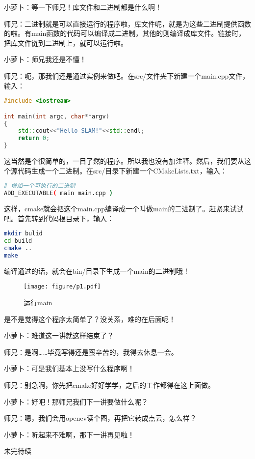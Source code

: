 \documentclass[9pt,a4paper]{article}
\begin{document}
小萝卜：等一下师兄！库文件和二进制都是什么啊！

师兄：二进制就是可以直接运行的程序啦，库文件呢，就是为这些二进制提供函数的啦。有main函数的代码可以编译成二进制，其他的则编译成库文件。链接时，把库文件链到二进制上，就可以运行啦。

小萝卜：师兄我还是不懂！

师兄：呃，那我们还是通过实例来做吧。在src/文件夹下新建一个main.cpp文件，输入：

\begin{lstlisting}[language=C++]
#include <iostream>

int main(int argc, char**argv)
{
    std::cout<<"Hello SLAM!"<<std::endl;
    return 0;
}
\end{lstlisting}

这当然是个很简单的，一目了然的程序。所以我也没有加注释。然后，我们要从这个源代码生成一个二进制。在src/目录下新建一个CMakeLists.txt，输入：

\begin{lstlisting}[language=sh]
# 增加一个可执行的二进制
ADD_EXECUTABLE( main main.cpp )
\end{lstlisting}

这样，cmake就会把这个main.cpp编译成一个叫做main的二进制了。赶紧来试试吧。首先转到代码根目录下，输入：

\begin{lstlisting}[language=sh]
mkdir bulid
cd build
cmake ..
make
\end{lstlisting}

编译通过的话，就会在bin/目录下生成一个main的二进制哦！

\begin{figure}[!htp]
\centering
\texttt{[image: figure/p1.pdf]}
\caption{运行main}
\end{figure}

是不是觉得这个程序太简单了？没关系，难的在后面呢！

小萝卜：难道这一讲就这样结束了？

师兄：是啊……毕竟写得还是蛮辛苦的，我得去休息一会。

小萝卜：可是我们基本上没写什么程序啊！

师兄：别急啊，你先把cmake好好学学，之后的工作都得在这上面做。

小萝卜：好吧！那师兄我们下一讲要做什么呢？

师兄：嗯，我们会用opencv读个图，再把它转成点云，怎么样？

小萝卜：听起来不难啊，那下一讲再见啦！

\begin{framed}
未完待续    
\end{framed}
    
\end{document}
